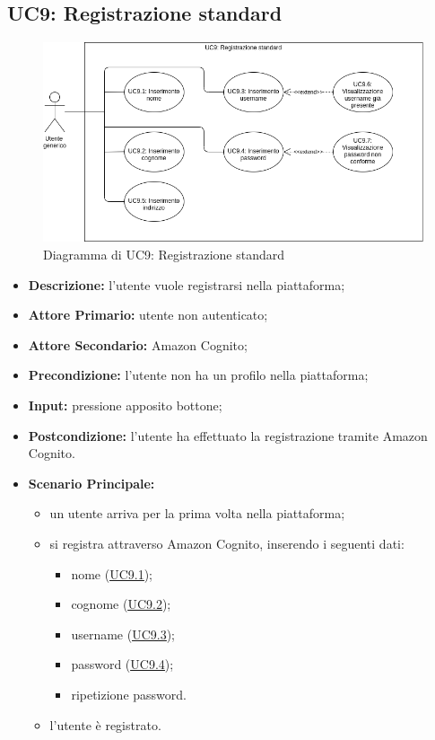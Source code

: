 \newpage
\subsection{UC9: Registrazione standard}
\label{sec:UC9}
\begin{figure}[!ht]
    \caption{Diagramma di UC9: Registrazione standard}
    \vspace{10px}
    \includegraphics[scale=0.5]{../../../Images/AnalisiRequisiti/UC09.png}
    \centering
\end{figure}
\begin{itemize}
    \item \textbf{Descrizione:} l'utente vuole registrarsi nella piattaforma;
    \item \textbf{Attore Primario:} utente non autenticato;
    \item \textbf{Attore Secondario:} Amazon Cognito;
    \item \textbf{Precondizione:} l'utente non ha un profilo nella piattaforma;
    \item \textbf{Input:} pressione apposito bottone;
    \item \textbf{Postcondizione:} l'utente ha effettuato la registrazione tramite Amazon Cognito.
    \item \textbf{Scenario Principale:}
          \begin{itemize}
              \item un utente arriva per la prima volta nella piattaforma;
              \item si registra attraverso Amazon Cognito, inserendo i seguenti dati:
                    \begin{itemize}
                        \item nome (\hyperref[sec:UC9.1]{\underline{UC9.1}});
                        \item cognome (\hyperref[sec:UC9.2]{\underline{UC9.2}});
                        \item username (\hyperref[sec:UC9.3]{\underline{UC9.3}});
                        \item password (\hyperref[sec:UC9.4]{\underline{UC9.4}});
                        \item ripetizione password.
                    \end{itemize}
              \item l'utente è registrato.
          \end{itemize}
\end{itemize}

